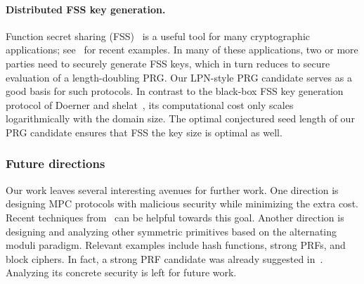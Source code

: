 \paragraph{Distributed FSS key generation.} Function secret sharing (FSS)~\cite{boyle2015-fss} is a useful tool for many cryptographic applications; see~\cite{BoyleCGGIKR20,boyle2020-lpn-pcg} for recent examples. In many of these applications, two or more parties need to securely generate FSS keys, which in turn reduces to secure evaluation of a length-doubling PRG. Our LPN-style PRG candidate serves as a good basis for such protocols. In contrast to the black-box FSS key generation protocol of Doerner and shelat~\cite{DoernerS17}, its computational cost only scales logarithmically with the domain size. The optimal conjectured seed length of our PRG candidate ensures that FSS the key size is optimal as well.


\subsubsection{Future directions} Our work leaves several interesting avenues for further work. One direction is designing MPC protocols with malicious security while minimizing the extra cost. Recent techniques from~\cite{BBCGI19,BGIN19} can be helpful towards this goal. Another direction is designing and analyzing other symmetric primitives based on the alternating moduli paradigm. Relevant examples include hash functions, strong PRFs, and block ciphers. 
In fact, a strong PRF candidate was already suggested in~\cite{boneh2018-darkmatter}.  Analyzing its concrete security is left for future work.


%
